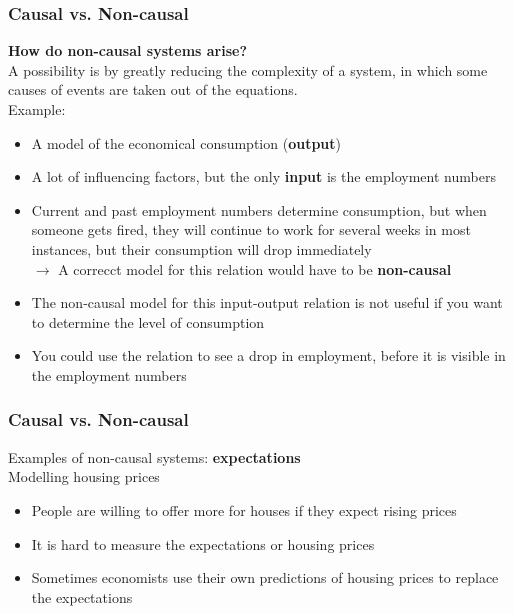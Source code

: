 \documentclass{beamer}
\begin{document}

\begin{frame}
\frametitle{Causal vs. Non-causal}
\textbf{How do non-causal systems arise?}\\
\medskip
A possibility is by greatly reducing the complexity of a system, in which some causes of events are taken out of the equations.\\
Example:\\
\begin{itemize}
\item A model of the economical consumption (\textbf{output})
\item A lot of influencing factors, but the only \textbf{input} is the employment numbers
\item Current and past employment numbers determine consumption, but when someone gets fired, they will continue to work for several weeks in most instances, but their consumption will drop immediately\\
$\rightarrow$ A correcct model for this relation would have to be \textbf{non-causal}
\item The non-causal model for this input-output relation is not useful if you want to determine the level of consumption
\item You could use the relation to see a drop in employment, before it is visible in the employment numbers
\end{itemize}
\end{frame}


\begin{frame}
\frametitle{Causal vs. Non-causal}
\vspace{-12ex}
Examples of non-causal systems: \textbf{expectations}\\
\medskip
Modelling housing prices\\
\begin{itemize}
\item People are willing to offer more for houses if they expect rising prices
\item It is hard to measure the expectations or housing prices
\item Sometimes economists use their own predictions of housing prices to replace the expectations
\end{itemize}
\end{frame}

\end{document}
